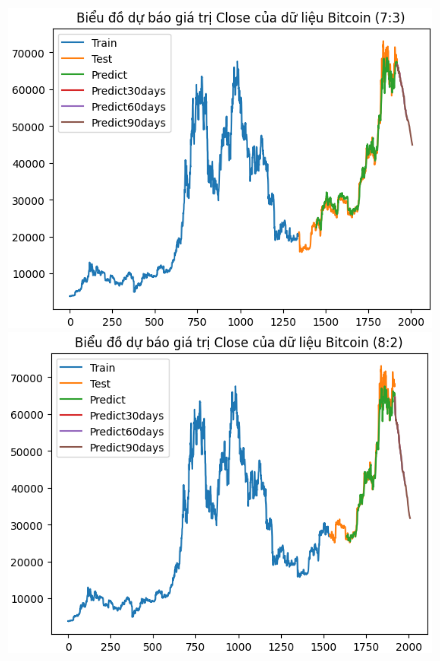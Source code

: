 \documentclass[conference]{IEEEtran}
\begin{document}
\begin{figure}[H]
    \centering
    \begin{minipage}{0.15\textwidth}
    \centering
    \includegraphics[width=1\textwidth]{Figure/BTC73.png}
    \end{minipage}
    \hfill
    \begin{minipage}{0.15\textwidth}
    \centering
    \includegraphics[width=1\textwidth]{Figure/BTC82.png}
    \end{minipage}
    \hfill
    \begin{minipage}{0.15\textwidth}
    \centering

\end{minipage}
\end{figure}
\end{document}
